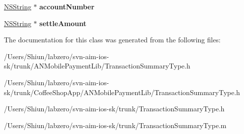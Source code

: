 \begin{DoxyCompactItemize}
\item 
\hypertarget{interface_transaction_summary_type_ae562007beab23df76b6593e8c37dab8b}{
\hyperlink{class_n_s_string}{NSString} $\ast$ {\bfseries accountNumber}}
\label{interface_transaction_summary_type_ae562007beab23df76b6593e8c37dab8b}

\item 
\hypertarget{interface_transaction_summary_type_ae57eee0df92296672b4a392b75847f8f}{
\hyperlink{class_n_s_string}{NSString} $\ast$ {\bfseries settleAmount}}
\label{interface_transaction_summary_type_ae57eee0df92296672b4a392b75847f8f}

\end{DoxyCompactItemize}


The documentation for this class was generated from the following files:\begin{DoxyCompactItemize}
\item 
/Users/Shiun/labzero/svn-\/aim-\/ios-\/sk/trunk/ANMobilePaymentLib/TransactionSummaryType.h\item 
/Users/Shiun/labzero/svn-\/aim-\/ios-\/sk/trunk/CoffeeShopApp/ANMobilePaymentLib/TransactionSummaryType.h\item 
/Users/Shiun/labzero/svn-\/aim-\/ios-\/sk/trunk/TransactionSummaryType.h\item 
/Users/Shiun/labzero/svn-\/aim-\/ios-\/sk/trunk/TransactionSummaryType.m\end{DoxyCompactItemize}
